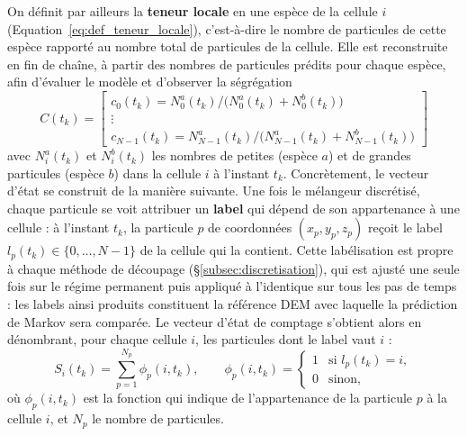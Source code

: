\documentclass[french]{MemoireMaster}
\begin{document}
On définit par ailleurs la \textbf{teneur locale} en une espèce de la cellule $i$ (Equation~\ref{eq:def_teneur_locale}), c'est-à-dire le nombre de particules de cette espèce rapporté au nombre total de particules de la cellule. 
Elle est reconstruite en fin de chaîne, à partir des nombres de particules prédits pour chaque espèce, afin d'évaluer le modèle et d'observer la ségrégation 
\begin{equation}
  C(t_k) 
= 
\begin{bmatrix}
  
  c_0(t_k)=N^a_0(t_k) / \big( N^a_0(t_k) + N^b_0(t_k) \big)\\
\vdots\\ 
  c_{N-1}(t_k)=N^a_{N-1}(t_k) / \big( N^a_{N-1}(t_k) + N^b_{N-1}(t_k) \big) 
   
\end{bmatrix}
\label{eq:def_teneur_locale}
\end{equation}
avec $N^a_i(t_k)$ et $N^b_i(t_k)$ les nombres de petites (espèce $a$) et de grandes particules (espèce $b$) dans la cellule $i$ à l'instant $t_k$.
Concrètement, le vecteur d'état se construit de la manière suivante. Une fois le mélangeur discrétisé, chaque particule se voit attribuer un \textbf{label} qui dépend de son appartenance à une cellule : à l'instant $t_k$, la particule $p$ de coordonnées $(x_p, y_p, z_p)$ reçoit le label $l_p(t_k) \in \{0, \dots, N-1\}$ de la cellule qui la contient. Cette labélisation est  propre à chaque méthode de découpage (\S\ref{subsec:discretisation}), qui est ajusté une seule fois sur le régime permanent puis appliqué à l'identique sur tous les pas de temps : les labels ainsi produits constituent la référence DEM avec laquelle la prédiction de Markov sera comparée. Le vecteur d'état de comptage s'obtient alors en dénombrant, pour chaque cellule $i$, les particules dont le label vaut $i$ :
\begin{equation}
  S_i(t_k) = \sum_{p=1}^{N_p} \phi_p(i, t_k),
  \qquad
  \phi_p(i,t_k) =
  \begin{cases}
    1 & \text{si } l_p(t_k) = i,\\
    0 & \text{sinon},
  \end{cases}
  \label{eq:comptage}
\end{equation}
où $\phi_p(i,t_k)$ est la fonction qui indique de l'appartenance de la particule $p$ à la cellule $i$, et $N_p$ le nombre de particules.
\end{document}
